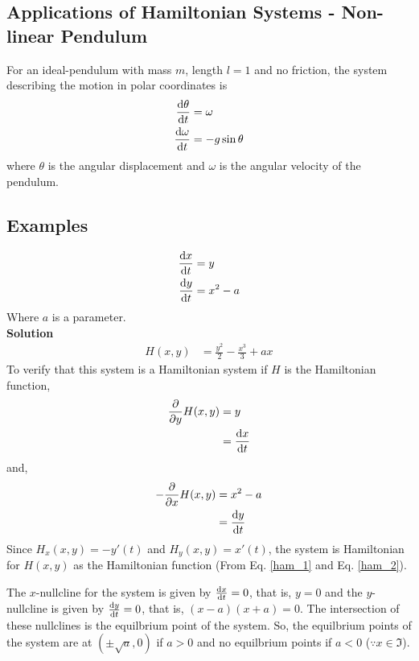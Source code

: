 \documentclass[12pt,1in]{article}
\newenvironment{Example}[2][Example]{\begin{trivlist}
		\item[\hskip \labelsep {\bfseries #1}\hskip \labelsep {\bfseries #2.}]}{\end{trivlist}}
\begin{document}
\subsection{Applications of Hamiltonian Systems - Non-linear Pendulum}
For an ideal-pendulum with mass $m$, length $l = 1$ and no friction, the system describing the motion in polar coordinates is 
\begin{align*}
\derivative{\theta}{t} &= \omega \\
\derivative{\omega}{t} &= -g \sin\theta
\end{align*}  
where $\theta$ is the angular displacement and $\omega$ is the angular velocity of the pendulum. 
\subsection{Examples}
\begin{Example}{1}
	\begin{align*}
	\derivative{x}{t} &= y \\
	\derivative{y}{t} &= x^2 - a
	\end{align*}
	Where $a$ is a parameter. \\
	{\bfseries Solution\\}
	\begin{align*}
	H(x,y) &= \frac{y^2}{2} - \frac{x^3}{3} + ax
	\end{align*}
	To verify that this system is a Hamiltonian system if $H$ is the Hamiltonian function,
	\begin{align*}
	\frac{\partial}{\partial y}H(x,y) &= y\\
	&= \derivative{x}{t}
	\end{align*}
	and,
	\begin{align*}
	- \frac{\partial}{\partial x} H(x,y) &= x^2 - a\\
	&= \derivative{y}{t}
	\end{align*}
	Since $H_x(x,y) = - y'(t)$ and $H_y(x,y) = x'(t)$, the system is Hamiltonian for $H(x,y)$ as the Hamiltonian function (From Eq. \ref{ham_1} and Eq. \ref{ham_2}).
	
	
	The $x$-nullcline for the system is given by $\derivative{x}{t} = 0$, that is, $y = 0$ and the $y$-nullcline is given by $\derivative{y}{t}=0$, that is, $(x -a)(x+a) = 0$. The intersection of these nullclines is the equilbrium point of the system. So, the equilbrium points of the system are at $(\pm\sqrt{a}, 0)$ if $a > 0$ and no equilbrium points if $a < 0$ ($\because x \in \Im$).
	

\end{Example}
\end{document}
